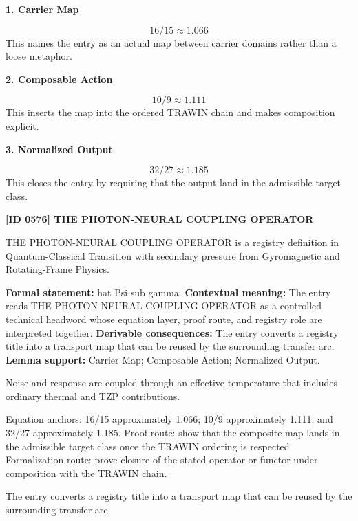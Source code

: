 \noindent\textbf{1. Carrier Map}\par
\[
16/15 \approx 1.066
\]
\noindent This names the entry as an actual map between carrier domains rather than a loose metaphor.\par
\noindent\textbf{2. Composable Action}\par
\[
10/9 \approx 1.111
\]
\noindent This inserts the map into the ordered TRAWIN chain and makes composition explicit.\par
\noindent\textbf{3. Normalized Output}\par
\[
32/27 \approx 1.185
\]
\noindent This closes the entry by requiring that the output land in the admissible target class.\par

\clearpage
\noindent\textbf{[ID 0576] THE PHOTON-NEURAL COUPLING OPERATOR}\par
\vspace{0.35em}
\begingroup\small
{}
THE PHOTON-NEURAL COUPLING OPERATOR is a registry definition in Quantum-Classical Transition with secondary pressure from Gyromagnetic and Rotating-Frame Physics.

\begingroup\footnotesize\setlength{\emergencystretch}{3em}\sloppy
\textbf{Formal statement:} hat Psi sub gamma. \textbf{Contextual meaning:} The entry reads THE PHOTON-NEURAL COUPLING OPERATOR as a controlled technical headword whose equation layer, proof route, and registry role are interpreted together. \textbf{Derivable consequences:} The entry converts a registry title into a transport map that can be reused by the surrounding transfer arc. \textbf{Lemma support:} Carrier Map; Composable Action; Normalized Output.\par
\endgroup

Noise and response are coupled through an effective temperature that includes ordinary thermal and TZP contributions.

Equation anchors: 16/15 approximately 1.066; 10/9 approximately 1.111; and 32/27 approximately 1.185. Proof route: show that the composite map lands in the admissible target class once the TRAWIN ordering is respected. Formalization route: prove closure of the stated operator or functor under composition with the TRAWIN chain.

The entry converts a registry title into a transport map that can be reused by the surrounding transfer arc.
\endgroup

